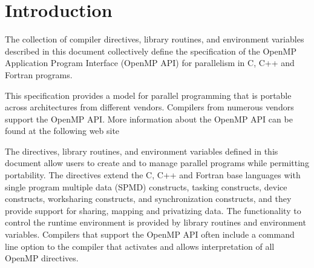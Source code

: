 %
%
%
%
%
%
%
%
%
%

\chapter{Introduction}
\label{chap:introduction}
The collection of compiler directives, library routines, and environment
variables described in this document collectively define the specification of
the OpenMP Application Program Interface (OpenMP API) for parallelism in C, C++
and Fortran programs.

This specification provides a model for parallel programming that is portable
across architectures from different vendors. Compilers from numerous vendors
support the OpenMP API. More information about the OpenMP API can be found at
the following web site


The directives, library routines, and environment variables defined in this document 
allow users to create and to manage parallel programs while permitting portability. The 
directives extend the C, C++ and Fortran base languages with single program multiple 
data (SPMD) constructs, tasking constructs, device constructs, worksharing constructs, 
and synchronization constructs, and they provide support for sharing, mapping and privatizing 
data. The functionality to control the runtime environment is provided by library 
routines and environment variables. Compilers that support the OpenMP API often 
include a command line option to the compiler that activates and allows interpretation of 
all OpenMP directives.







